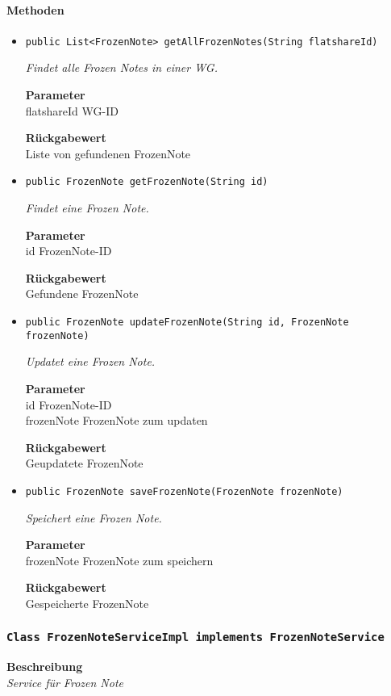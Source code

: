     \paragraph*{Methoden}
    \begin{itemize}
    	\item{\texttt{public List<FrozenNote> getAllFrozenNotes(String flatshareId)}}
    	
    	\textit{Findet alle Frozen Notes in einer WG.}
    	
    	\textbf{Parameter} \\
    	flatshareId WG-ID
    	
    	\textbf{Rückgabewert} \\
    	Liste von gefundenen FrozenNote        \item{\texttt{public FrozenNote getFrozenNote(String id)}}
    	
    	\textit{Findet eine Frozen Note.}
    	
    	\textbf{Parameter} \\
    	id FrozenNote-ID
    	
    	\textbf{Rückgabewert} \\
    	Gefundene FrozenNote        \item{\texttt{public FrozenNote updateFrozenNote(String id, FrozenNote frozenNote)}}
    	
    	\textit{Updatet eine Frozen Note.}
    	
    	\textbf{Parameter} \\
    	id FrozenNote-ID\\
    	frozenNote FrozenNote zum updaten
    	
    	\textbf{Rückgabewert} \\
    	Geupdatete FrozenNote        \item{\texttt{public FrozenNote saveFrozenNote(FrozenNote frozenNote)}}
    	
    	\textit{Speichert eine Frozen Note.}
    	
    	\textbf{Parameter} \\
    	frozenNote FrozenNote zum speichern
    	
    	\textbf{Rückgabewert} \\
    	Gespeicherte FrozenNote
    \end{itemize}
    \subsubsection{\texttt{Class FrozenNoteServiceImpl implements FrozenNoteService}}
    \textbf{Beschreibung} \\
    \textit{Service für Frozen Note}
